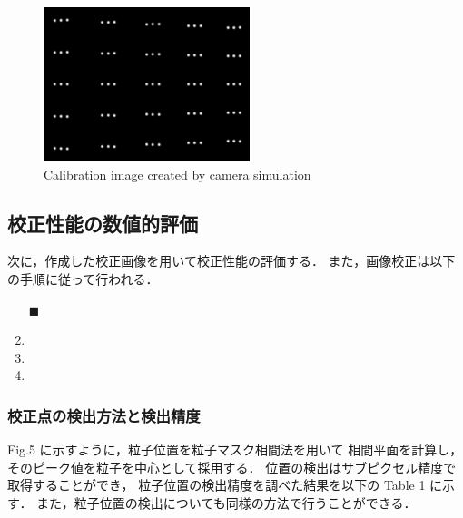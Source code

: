 \documentclass[twocolumn,a4j]{jsarticle}
\begin{document}
\newpage
\begin{figure}[htbp]
  \centering
  \includegraphics[keepaspectratio, width=60mm]{../images/Calibration/simulation.bmp}
  \caption{Calibration image created by camera simulation}
\end{figure}

\subsection{校正性能の数値的評価}
次に，作成した校正画像を用いて校正性能の評価する．
また，画像校正は以下の手順に従って行われる．

\begin{enumerate} [(1)]
  \item [$\blacksquare$] 
  \item {}
  \item {}
  \item {}
\end{enumerate}

\subsubsection{校正点の検出方法と検出精度}
Fig.5 に示すように，粒子位置を粒子マスク相間法を用いて
相間平面を計算し，そのピーク値を粒子を中心として採用する．
位置の検出はサブピクセル精度で取得することができ，
粒子位置の検出精度を調べた結果を以下の Table 1 に示す．
また，粒子位置の検出についても同様の方法で行うことができる．
\end{document}
